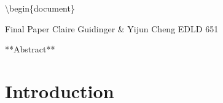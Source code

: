 \documentclass[
  12pt,
]{article}
\author{}
\date{\vspace{-2.5em}}
\begin{document}
\textbackslash begin\{document\} \allsectionsfont{\centering}
\subsectionfont{\raggedright} \subsubsectionfont{\raggedright}


\begin{centering}
\vspace{24pt}
Final Paper
Claire Guidinger & Yijun Cheng
EDLD 651
\end{centering}

\newpage

\begin{centering}
**Abstract**
\end{centering}

\newpage
{}

\hypertarget{introduction}{%
\section{\texorpdfstring{\textbf{Introduction}}{Introduction}}\label{introduction}}
\end{document}
